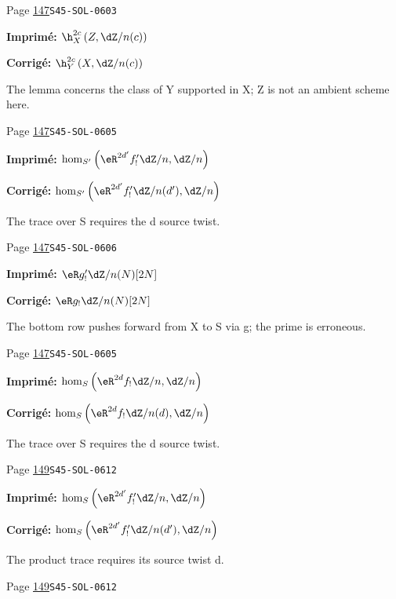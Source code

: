 \begin{description}
\smallskip
\item[\hypertarget{apparatus:FR-0107}{107}] Page \hyperlink{printpage:fr:147}{147}\quad\texttt{S45-SOL-0603}
\par\noindent\textbf{Imprimé:} \(\h_X^{2 c}\left(Z,\dZ/n(c)\right)\)
\par\noindent\textbf{Corrigé:} \(\h_Y^{2 c}\left(X,\dZ/n(c)\right)\)
\par\noindent The lemma concerns the class of Y supported in X; Z is not an ambient scheme here.
\smallskip
\item[\hypertarget{apparatus:FR-0108}{108}] Page \hyperlink{printpage:fr:147}{147}\quad\texttt{S45-SOL-0605}
\par\noindent\textbf{Imprimé:} \(\hom_{S'}\left(\eR^{2 d'} f_!' \dZ/n,\dZ/n\right)\)
\par\noindent\textbf{Corrigé:} \(\hom_{S'}\left(\eR^{2 d'} f_!' \dZ/n(d'),\dZ/n\right)\)
\par\noindent The trace over S requires the d source twist.
\smallskip
\item[\hypertarget{apparatus:FR-0109}{109}] Page \hyperlink{printpage:fr:147}{147}\quad\texttt{S45-SOL-0606}
\par\noindent\textbf{Imprimé:} \(\eR g_!'\dZ/n(N)[2 N]\)
\par\noindent\textbf{Corrigé:} \(\eR g_!\dZ/n(N)[2 N]\)
\par\noindent The bottom row pushes forward from X to S via g; the prime is erroneous.
\smallskip
\item[\hypertarget{apparatus:FR-0110}{110}] Page \hyperlink{printpage:fr:147}{147}\quad\texttt{S45-SOL-0605}
\par\noindent\textbf{Imprimé:} \(\hom_S\left(\eR^{2 d} f_!\dZ/n,\dZ/n\right)\)
\par\noindent\textbf{Corrigé:} \(\hom_S\left(\eR^{2 d} f_!\dZ/n(d),\dZ/n\right)\)
\par\noindent The trace over S requires the d source twist.
\smallskip
\item[\hypertarget{apparatus:FR-0111}{111}] Page \hyperlink{printpage:fr:149}{149}\quad\texttt{S45-SOL-0612}
\par\noindent\textbf{Imprimé:} \(\hom_S\left(\eR^{2 d'} f_!' \dZ/n,\dZ/n\right)\)
\par\noindent\textbf{Corrigé:} \(\hom_S\left(\eR^{2 d'} f_!' \dZ/n(d'),\dZ/n\right)\)
\par\noindent The product trace requires its source twist d.
\smallskip
\item[\hypertarget{apparatus:FR-0112}{112}] Page \hyperlink{printpage:fr:149}{149}\quad\texttt{S45-SOL-0612}

\end{description}
